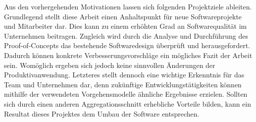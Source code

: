Aus den vorhergehenden Motivationen lassen sich folgenden Projektziele ableiten. Grundlegend stellt diese Arbeit einen Anhaltspunkt für neue Softwareprojekte und Mitarbeiter dar. Dies kann zu einem erhöhten Grad an Softwarequalität im Unternehmen beitragen. Zugleich wird durch die Analyse und Durchführung des Proof-of-Concepts das bestehende Softwaredesign überprüft und herausgefordert. Dadurch können konkrete Verbesserungsvorschläge ein mögliches Fazit der Arbeit sein. Womöglich ergeben sich jedoch keine sinnvollen Änderungen der Produktivanwendung. Letzteres stellt dennoch eine wichtige Erkenntnis für das Team und Unternehmen dar, denn zukünftige Entwicklungstätigkeiten können mithilfe der verwendeten Vorgehensmodelle ähnliche Ergebnisse erzielen. Sollten sich durch einen anderen Aggregationsschnitt erhebliche Vorteile bilden, kann ein Resultat dieses Projektes dem Umbau der Software entsprechen.
